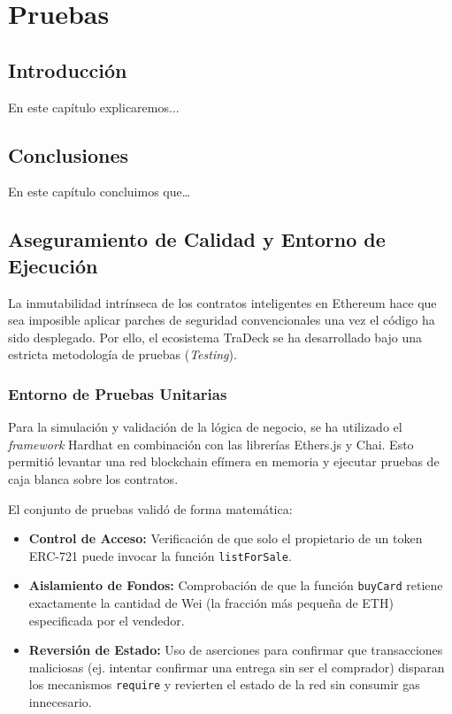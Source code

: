 \chapter{Pruebas}\label{cap:pruebas}

\section{Introducción}
En este capítulo explicaremos...

\section{Conclusiones}
En este capítulo concluimos que\dots

\section{Aseguramiento de Calidad y Entorno de Ejecución}
La inmutabilidad intrínseca de los contratos inteligentes en Ethereum hace que sea imposible aplicar parches de seguridad convencionales una vez el código ha sido desplegado. Por ello, el ecosistema TraDeck se ha desarrollado bajo una estricta metodología de pruebas (\textit{Testing}).

\subsection{Entorno de Pruebas Unitarias}
Para la simulación y validación de la lógica de negocio, se ha utilizado el \textit{framework} Hardhat en combinación con las librerías Ethers.js y Chai. Esto permitió levantar una red blockchain efímera en memoria y ejecutar pruebas de caja blanca sobre los contratos.

El conjunto de pruebas validó de forma matemática:
\begin{itemize}
    \item \textbf{Control de Acceso:} Verificación de que solo el propietario de un token ERC-721 puede invocar la función \texttt{listForSale}.
    \item \textbf{Aislamiento de Fondos:} Comprobación de que la función \texttt{buyCard} retiene exactamente la cantidad de Wei (la fracción más pequeña de ETH) especificada por el vendedor.
    \item \textbf{Reversión de Estado:} Uso de aserciones para confirmar que transacciones maliciosas (ej. intentar confirmar una entrega sin ser el comprador) disparan los mecanismos \texttt{require} y revierten el estado de la red sin consumir gas innecesario.
\end{itemize}
